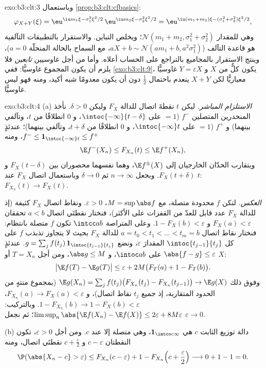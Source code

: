 \begin{solution}{exo:b3:clt:3}
 وباستعمال \cref{prop:b3:clt:cfbasics}:
\[
\varphi_{X+Y}(\xi) = \eu^{\iu m_1\xi - \sigma_1^2\xi^2/2}\,
\eu^{\iu m_2\xi - \sigma_2^2\xi^2/2}
= \eu^{\iu(m_1+m_2)\xi - (\sigma_1^2+\sigma_2^2)\xi^2/2},
\]
وهي  للمقدار $\mathcal N(m_1 + m_2, \sigma_1^2 + \sigma_2^2)$؛ ويخلص التباين. والاستقرار
بالتطبيقات التآلفية هو قاعدة التآلف ($aX + b \sim \mathcal N(am_1 + b,
a^2\sigma_1^2)$، مع السماح بالحالة
المنحلّة $a = 0$)، وينتج الاستقرار بالمجاميع  بالتراجع
على الحساب أعلاه. وأما من أجل غاوسيين \emph{تابعين} فلا يلزم أن
يكون المجموع غاوسيًّا: ففي \cref{exo:b3:clt:9}، يكون كلٌّ من $X$ و $Y =
\varepsilon X$
غاوسيًّا معياريًّا لكن $X + Y$ ينعدم باحتمال $\frac12$ دون أن
يكون معدومًا شبه أكيد، ومنه فهو ليس غاوسيًّا.
\end{solution}

\begin{solution}{exo:b3:clt:4}
(a) \emph{الاستلزام المباشر.} ليكن $t$ نقطةَ اتصال للدالة $F_X$
وليكن $\delta > 0$. نأخذ المنحدرين المتصلين $f^-$ ($= 1$ على
$\intoc{-\infty}{t-\delta}$، و $0$ انطلاقًا من $t$، وتآلفي بينهما) و $f^+$ ($= 1$
على $\intoc{-\infty}t$، و $0$ انطلاقًا من $t + \delta$، وتآلفي بينهما)؛
عندئذٍ $f^- \leq
\mathbf 1_{\intoc{-\infty}t} \leq f^+$، ومنه
\[
\E f^-(X_n) \leq F_{X_n}(t) \leq \E f^+(X_n),
\]
ويتقارب الحدّان الخارجيان إلى $\E f^\pm(X)$، وهما نفسهما
محصوران بين $F_X(t - \delta)$ و $F_X(t + \delta)$. وبجعل $n \to \infty$ ثم
$\delta \to 0$ وباستعمال اتصال $F_X$ عند $t$: $F_{X_n}(t) \to F_X(t)$.

\emph{العكس.} لتكن $f$ محدودة متصلة، مع $M =
\sup\abs f$، $\varepsilon > 0$. ونقاط
اتصال $F_X$ كثيفة (إذ للدالة $F_X$ عدد قابل للعدّ من القفزات على
الأكثر)، فنختار نقطتَي اتصال $a < b$ تحققان $F_X(a) < \varepsilon$ و $1 - F_X(b) < \varepsilon$.
وعلى المتراصة $\intcc ab$ تكون $f$ متصلة بانتظام: فنختار نقاط
اتصال $a = t_0 < t_1 < \dots < t_m = b$ للدالة $F_X$ بحيث لا يتجاوز تذبذب $f$ على كل
$\intoc{t_{j-1}}{t_j}$ المقدارَ $\varepsilon$، ونضع $g = \sum_j
f(t_j)\,\mathbf 1_{\intoc{t_{j-1}}{t_j}}$. عندئذٍ $\abs{f - g}
\leq \varepsilon$ على
$\intoc ab$، و $\abs g \leq M$، ومن أجل $T = X_n$ أو $X$:
\[
\bigl|\E f(T) - \E g(T)\bigr| \leq \varepsilon +
2M\bigl(F_T(a) + 1 - F_T(b)\bigr).
\]
وفوق ذلك $\E g(X_n) = \sum_j f(t_j)\bigl(F_{X_n}(t_j) -
F_{X_n}(t_{j-1})\bigr) \to \E g(X)$ (بمجموع منتهٍ من الحدود المتقاربة، إذ جميع
$t_j$ نقاط اتصال)، و $F_{X_n}(a) \to F_X(a) < \varepsilon$، $1 - F_{X_n}(b) \to 1
- F_X(b) < \varepsilon$. وبالتركيب: $\limsup_n\abs{\E f(X_n) - \E f(X)} \leq 2\varepsilon +
8M\varepsilon$؛ ثم نجعل
$\varepsilon \to 0$.

(b) دالة توزيع الثابت $c$ هي $\mathbf 1_{\intco c\infty}$، وهي متصلة إلا عند $c$. ومن
أجل $\varepsilon > 0$، تكون النقطتان $c - \varepsilon$ و $c +
\frac\varepsilon2$ نقطتَي اتصال، ومنه
\[
\P(\abs{X_n - c} > \varepsilon) \leq F_{X_n}(c -
\varepsilon) + 1 - F_{X_n}\Bigl(c + \frac\varepsilon2\Bigr)
\longrightarrow 0 + 1 - 1 = 0 .
\]
\end{solution}

